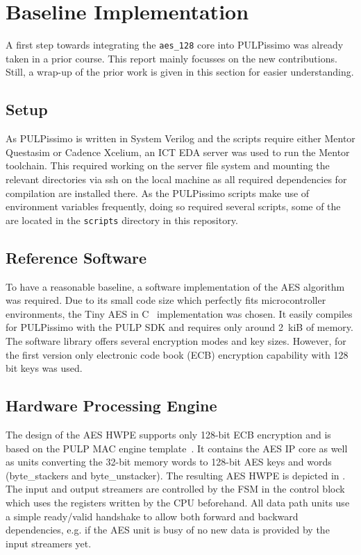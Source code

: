 \documentclass[a4paper, 12pt]{article}
\begin{document}
\section{Baseline Implementation} \label{sec:implementation}

A first step towards integrating the \verb|aes_128| core into PULPissimo was already taken in a prior course. This report mainly focusses on the new contributions. Still, a wrap-up of the prior work is given in this section for easier understanding.

\subsection{Setup} \label{sec:implementation:setup}

As PULPissimo is written in System Verilog and the scripts require either Mentor Questasim or Cadence Xcelium, an ICT EDA server was used to run the Mentor toolchain. This required working on the server file system and mounting the relevant directories via ssh on the local machine as all required dependencies for compilation are installed there. As the PULPissimo scripts make use of environment variables frequently, doing so required several scripts, some of the are located in the \verb|scripts| directory in this repository.

\subsection{Reference Software}

To have a reasonable baseline, a software implementation of the AES algorithm was required. Due to its small code size which perfectly fits microcontroller environments, the Tiny AES in C~\cite{tiny-aes-c} implementation was chosen. It easily compiles for PULPissimo with the PULP SDK and requires only around \SI{2}{kiB} of memory. The software library offers several encryption modes and key sizes. However, for the first version only electronic code book (ECB) encryption capability with 128 bit keys was used. 

\subsection{Hardware Processing Engine}

The design of the AES HWPE supports only 128-bit ECB encryption and is based on the PULP MAC engine template~\cite{hwpe-mac}. It contains the AES IP core as well as units converting the 32-bit memory words to 128-bit AES keys and words (byte\_stackers and byte\_unstacker). The resulting AES HWPE is depicted in . The input and output streamers are controlled by the FSM in the control block which uses the registers written by the CPU beforehand. All data path units use a simple ready/valid handshake to allow both forward and backward dependencies, e.g. if the AES unit is busy of no new data is provided by the input streamers yet.
\end{document}

